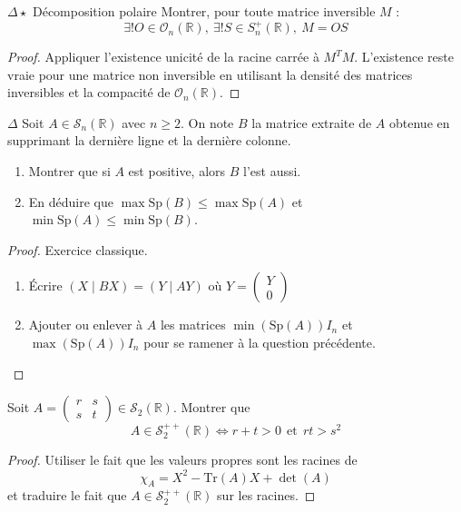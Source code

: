 \documentclass[french,a4paper]{article}
\newcommand{\R}{\mathbb{R}}
\newcommand{\Tr}{\text{Tr}}
\theoremstyle{plain}
\theoremstyle{definition}
\theoremstyle{remark}
\begin{document}
\begin{ex}{$\Delta\star$ Décomposition polaire} Montrer, pour toute matrice inversible $M$ : $$\exists! O\in\mathcal{O}_n(\R),\ \exists! S\in S_n^+(\R),\ M=OS$$
\end{ex}
\begin{proof}
	Appliquer l'existence unicité de la racine carrée à $M^TM$. L'existence reste vraie pour une matrice non inversible en utilisant la densité des matrices inversibles et la compacité de $\mathcal{O}_n(\R)$.
\end{proof}

\begin{ex}{$\Delta$}
	Soit $A\in\mathcal{S}_n(\R)$ avec $n\geqslant 2$. On note $B$ la matrice extraite de $A$ obtenue en supprimant la dernière ligne et la dernière colonne.
	\begin{enumerate}
		\item Montrer que si $A$ est positive, alors $B$ l'est aussi.
		\item En déduire que $\max\text{Sp}(B)\leqslant \max\text{Sp}(A)$ et $\min\text{Sp}(A)\leqslant\min\text{Sp}(B)$.
	\end{enumerate}
\end{ex}
\begin{proof}
	Exercice classique.
	\begin{enumerate}
		\item Écrire $(X\mid BX)=(Y\mid AY)$ où $Y=\begin{pmatrix}
			Y\\
			0
		\end{pmatrix}$
		\item Ajouter ou enlever à $A$ les matrices $\min(\text{Sp}(A))I_n$ et $\max(\text{Sp}(A))I_n$ pour se ramener à la question précédente.
	\end{enumerate}
\end{proof}

\begin{ex}{}
	Soit $A=\displaystyle\begin{pmatrix}
		r&s\\
		s&t
	\end{pmatrix}\in\mathcal{S}_2(\R)$. Montrer que $$A\in\mathcal{S}_{2}^{++}(\R)\iff r+t>0\ \ \text{et} \ \ rt>s^2$$
\end{ex}
\begin{proof}
	Utiliser le fait que les valeurs propres sont les racines de $$\chi_A=X^2-\Tr(A)X+\det(A)$$ et traduire le fait que $A\in\mathcal{S}_2^{++}(\R)$ sur les racines.
\end{proof}
\end{document}
